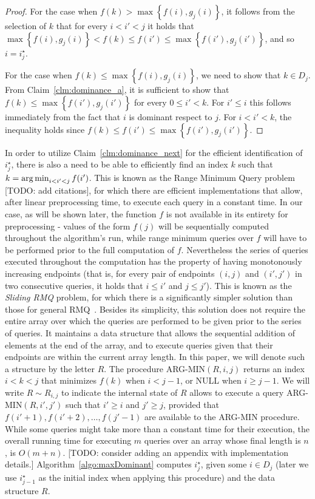 \begin{proof}
	For the case when $f(k) > \max\left\{f(i), g_j(i)\right\}$, it follows from the selection of $k$ that for every $i < i' < j$ it holds that $\max\left\{f(i), g_j(i)\right\} < f(k) \leq f(i') \leq \max\left\{f(i'), g_j(i')\right\}$, and so $i = i^\star_j$.
	
	For the case when $f(k) \leq \max\left\{f(i), g_j(i)\right\}$, we need to show that $k \in D_j$. From Claim~\ref{clm:dominance_a}, it is sufficient to show that $f(k) \leq \max\left\{f(i'), g_j(i')\right\}$ for every $0 \leq i' < k$. For $i' \leq i$ this follows immediately from the fact that $i$ is dominant respect to $j$. For $i < i' < k$, the inequality holds since $f(k) \leq f(i') \leq \max\left\{f(i'), g_j(i')\right\}$.
\end{proof}

In order to utilize Claim~\ref{clm:dominance_next} for the efficient identification of $i^\star_j$, there is also a need to be able to efficiently find an index $k$ such that $k = \operatorname*{arg\,min}_{i < i' < j} f(i')$. This is known as the Range Minimum Query problem [TODO: add citations], for which there are efficient implementations that allow, after linear preprocessing time, to execute each query in a constant time. In our case, as will be shown later, the function $f$ is not available in its entirety for preprocessing - values of the form $f(j)$ will be sequentially computed throughout the algorithm's run, while range minimum queries over $f$ will have to be performed prior to the full computation of $f$. Nevertheless the series of queries executed throughout the computation has the property of having monotonously increasing endpoints (that is, for every pair of endpoints $(i, j)$ and $(i', j')$ in two consecutive queries, it holds that $i \leq i'$ and $j \leq j'$). This is known as the \emph{Sliding RMQ} problem, for which there is a significantly simpler solution than those for general RMQ~\cite{lee2007simple}. Besides its simplicity, this solution does not require the entire array over which the queries are performed to be given prior to the series of queries. It maintains a data structure that allows the sequential addition of elements at the end of the array, and to execute queries given that their endpoints are within the current array length. In this paper, we will denote such a structure by the letter $R$. The procedure ARG-MIN$(R, i, j)$ returns an index $i < k < j$ that minimizes $f(k)$ when $i < j-1$, or NULL when $i \geq j-1$. We will write $R \sim R_{i, j}$ to indicate the internal state of $R$ allows to execute a query ARG-MIN$(R, i', j')$ such that $i' \geq i$ and $j' \geq j$, provided that $f(i'+1), f(i'+2), \ldots, f(j'-1)$ are available to the ARG-MIN procedure.
While some queries might take more than a constant time for their execution, the overall running time for executing $m$ queries over an array whose final length is $n$, is $O(m+n)$. 
[TODO: consider adding an appendix with implementation details.] Algorithm~\ref{algo:maxDominant} computes $i^\star_j$, given some $i \in D_j$ (later we use $i^\star_{j-1}$ as the initial index when applying this procedure) and the data structure $R$.

